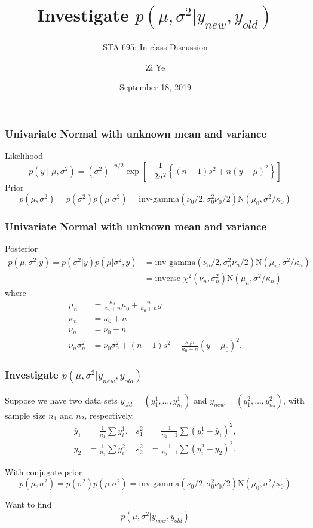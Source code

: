 \documentclass[compress]{beamer}
\title{Investigate $p(\mu,\sigma^2|y_{new},y_{old})$}
\subtitle{STA 695: In-class Discussion}
\author{Zi Ye}\institute{}
\date{September 18, 2019}
\begin{document}
{
\begin{withoutheadline}
	\begin{frame}
        \titlepage
    \end{frame} 
\end{withoutheadline}
} 


\begin{frame}
  \frametitle{Univariate Normal with unknown mean and variance}
Likelihood
\[
p(y \mid \mu, \sigma^2) = (\sigma^2)^{-n/2} \exp\left[ - \frac{1}{2\sigma^2}\left\{(n-1)  s^2 + n(\bar{y} - \mu)^2 \right\} \right]
\]
Prior
\[p(\mu, \sigma^2) = p(\sigma^2) p(\mu|\sigma^2) = \mbox{inv-gamma}(\nu_0/2, \sigma_0^2\nu_0/2) \mbox{N}(\mu_0, \sigma^2/\kappa_0)
\]

\end{frame}

\begin{frame}
\frametitle{Univariate Normal with unknown mean and variance}
  Posterior
\begin{align*}
  p(\mu, \sigma^2|y) = p(\sigma^2|y) p(\mu|\sigma^2,y) &= \mbox{inv-gamma}(\nu_n/2, \sigma_n^2\nu_n/2) \mbox{N}(\mu_n, \sigma^2/\kappa_n)\\
  &=\mbox{inverse-}\chi^2(\nu_n, \sigma_n^2) \mbox{N}(\mu_n, \sigma^2/\kappa_n)
\end{align*}
where
\begin{align*}
\mu_n &= \frac{\kappa_0}{\kappa_0+n}\mu_0+\frac{n}{\kappa_0+n}\bar{y}\\
\kappa_n &=\kappa_0+n\\
\nu_n &= \nu_0+n\\
\nu_n\sigma^2_n & = \nu_0\sigma_0^2+(n-1)s^2+\frac{\kappa_0 n}{\kappa_0 +n}(\bar{y}-\mu_0)^2.
\end{align*}
\end{frame}

\begin{frame}
\frametitle{Investigate $p(\mu,\sigma^2|y_{new},y_{old})$}

Suppose we have two data sets $y_{old}=(y_1^1,\ldots,y_{n_1}^1)$ and $y_{new}=(y_1^2,\ldots,y_{n_2}^2)$, with sample size $n_1$ and $n_2$, respectively.
\begin{align*}
\bar{y}_1&= \frac{1}{n_1}\sum y_i^1, & s_1^2 & = \frac{1}{n_1-1}\sum (y_i^1-\bar{y}_1)^2, \\
\bar{y}_2&=  \frac{1}{n_2}\sum y_i^2, & s_2^2 & = \frac{1}{n_2-1}\sum (y_i^2-\bar{y}_2)^2.
\end{align*}

With conjugate prior 
\[p(\mu, \sigma^2) = p(\sigma^2) p(\mu|\sigma^2) = \mbox{inv-gamma}(\nu_0/2, \sigma_0^2\nu_0/2) \mbox{N}(\mu_0, \sigma^2/\kappa_0)
\]

Want to find
$$
p(\mu,\sigma^2|y_{new},y_{old})
$$
\end{frame}
\end{document}
